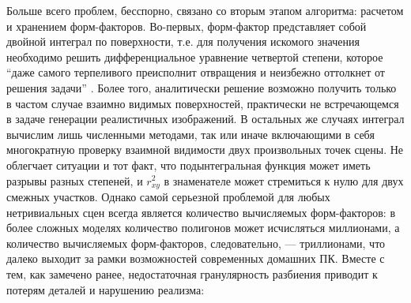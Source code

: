 \documentclass[12pt]{article}
\begin{document}
Больше всего проблем, бесспорно, связано со вторым этапом алгоритма: расчетом и хранением форм-факторов. Во-первых, форм-фактор представляет собой двойной интеграл по поверхности, т.е. для получения искомого значения необходимо решить дифференциальное уравнение четвертой степени, которое  ``даже самого терпеливого преисполнит отвращения и неизбежно оттолкнет от решения задачи'' \cite{Sch93}. Более того, аналитически решение возможно получить только в частом случае взаимно видимых поверхностей, практически не встречающемся в задаче генерации реалистичных изображений. В остальных же случаях интеграл вычислим лишь численными методами, так или иначе включающими в себя многократную проверку взаимной видимости двух произвольных точек сцены. Не облегчает ситуации и тот факт, что подынтегральная функция может иметь разрывы разных степеней, и $r_{xy}^2$ в знаменателе может стремиться к нулю для двух смежных участков. Однако самой серьезной проблемой для любых нетривиальных сцен всегда является количество вычисляемых форм-факторов: в более сложных моделях количество полигонов может исчисляться миллионами, а количество вычисляемых форм-факторов, следовательно, --- триллионами, что далеко выходит за рамки возможностей современных домашних ПК. Вместе с тем, как замечено ранее, недостаточная гранулярность разбиения приводит к потерям деталей и нарушению реализма:
\end{document}
